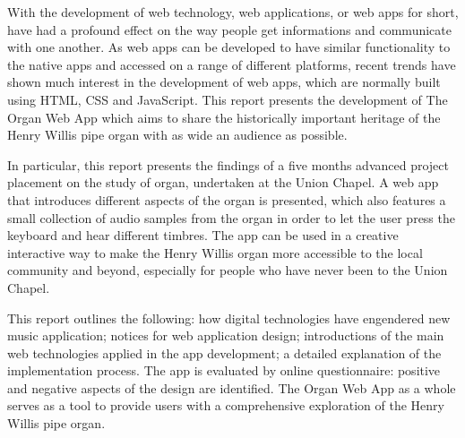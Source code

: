 With the development of web technology, web applications, or web apps for short, have had a profound effect on the way people get informations and communicate with one another. As web apps can be developed to have similar functionality to the native apps and accessed on a range of different platforms, recent trends have shown much interest in the development of web apps, which are normally built using HTML, CSS and JavaScript. This report presents the development of The Organ Web App which aims to share the historically important heritage of the Henry Willis pipe organ with as wide an audience as possible.

In particular, this report presents the findings of a five months advanced project placement on the study of organ, undertaken at the Union Chapel. A web app that introduces different aspects of the organ is presented, which also features a small collection of audio samples from the organ in order to let the user press the keyboard and hear different timbres. The app can be used in a creative interactive way to make the Henry Willis organ more accessible to the local community and beyond, especially for people who have never been to the Union Chapel.

This report outlines the following: how digital technologies have engendered new music application; notices for web application design; introductions of the main web technologies applied in the app development; a detailed explanation of the implementation process. The app is evaluated by online questionnaire: positive and negative aspects of the design are identified. The Organ Web App as a whole serves as a tool to provide users with a comprehensive exploration of the Henry Willis pipe organ.









